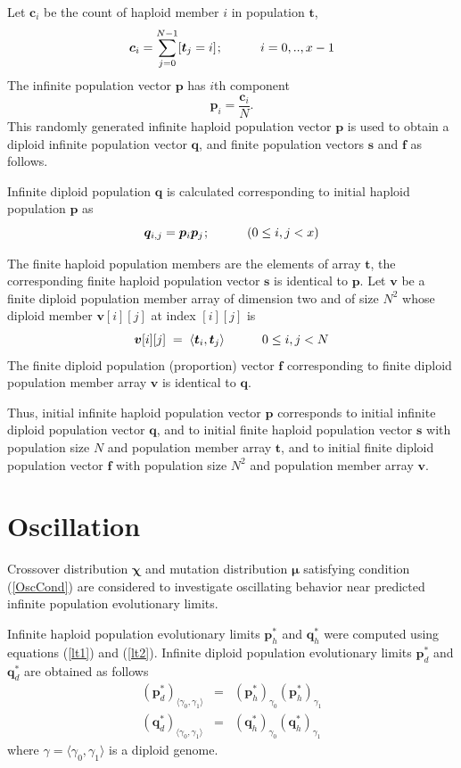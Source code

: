 Let $\bm{c}_i$ be the count of haploid member $i$ in population $\bm{t}$,
\[
\bm{c}_i = \sum \limits_{j=0}^{N-1} [\bm{t}_j = i]  \hspace{0.01in}; \hspace{30pt}  {i = 0,.., x-1}
\]
The infinite population vector $\bm{p}$ has $i$th component
\[
\bm{p}_i = \frac{\bm{c}_i}{ N }.
\]
This randomly generated infinite haploid population vector $\bm{p}$ is used to obtain a diploid infinite population vector $\bm{q}$,  
and finite population vectors $\bm{s}$ and $\bm{f}$ as follows.

Infinite diploid population $\bm{q}$ is calculated corresponding to initial haploid population $\bm{p}$ as
\[
\bm{q}_{i,j} = \bm{p}_i \bm{p}_j  \hspace{0.01in}; \hspace{30pt}  (0 \leq i,j < x)
\]

The finite haploid population members are the elements of array $\bm{t}$, 
the corresponding finite haploid population vector $\bm{s}$ is identical to $\bm{p}$. 
Let $\bm{v}$ be a finite diploid population member array of dimension two and of size $N^2$ whose diploid member 
$\bm{v}[i][j]$ at index $[i][j]$ is
\[
\bm{v}[i][j] \;=\; \langle \bm{t}_i, \bm{t}_j \rangle \hspace{30pt} 0 \leq i,j < N
\]
The finite diploid population (proportion) vector $\bm{f}$ corresponding to 
finite diploid population member array $\bm{v}$ is identical to $\bm{q}$.

Thus, initial infinite haploid population vector $\bm{p}$ corresponds to initial infinite diploid 
population vector $\bm{q}$, and to initial finite 
haploid population vector $\bm{s}$ with population size $N$ and population member array $\bm{t}$, 
and to initial finite diploid population vector $\bm{f}$ with population size $N^2$ and population member array $\bm{v}$.

\section{Oscillation}
\label{Oscillation}

Crossover distribution $\bm{\chi}$ and mutation distribution $\bm{\mu}$ satisfying 
condition (\ref{OscCond}) are considered to investigate oscillating behavior near 
predicted infinite population evolutionary limits.

Infinite haploid population evolutionary limits $\bm{p}_h^{\ast}$ and $\bm{q}_h^{\ast}$ 
were computed using equations (\ref{lt1}) and (\ref{lt2}). 
Infinite diploid population evolutionary limits $\bm{p}_d^{\ast}$ and $\bm{q}_d^{\ast}$ are obtained as follows
\begin{eqnarray*}
({\bm{p}_d^{\ast}})_{\langle \gamma_0, \gamma_1 \rangle} & = & ({\bm{p}_h^{\ast}})_{\gamma_0} ({\bm{p}_h^{\ast}})_{\gamma_1} \\
({\bm{q}_d^{\ast}})_{\langle \gamma_0, \gamma_1 \rangle} & = & ({\bm{q}_h^{\ast}})_{\gamma_0} ({\bm{q}_h^{\ast}})_{\gamma_1}
\end{eqnarray*}
where $\gamma = \langle \gamma_0, \gamma_1 \rangle$ is a diploid genome.

